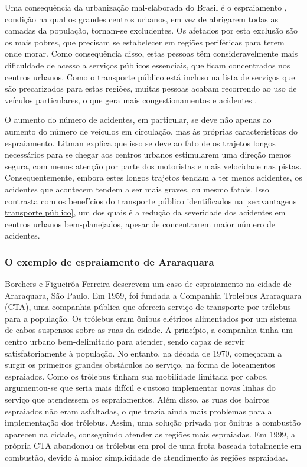 Uma consequência da urbanização mal-elaborada do Brasil é o espraiamento \cite{IPEA:10}, condição na qual os grandes centros urbanos, em vez de abrigarem todas as camadas da população, tornam-se excludentes. Os afetados por esta exclusão são os mais pobres, que precisam se estabelecer em regiões periféricas para terem onde morar. Como consequência disso, estas pessoas têm consideravelmente mais dificuldade de acesso a serviços públicos essenciais, que ficam concentrados nos centros urbanos. Como o transporte público está incluso na lista de serviços que são precarizados para estas regiões, muitas pessoas acabam recorrendo ao uso de veículos particulares, o que gera mais congestionamentos e acidentes \cite{IPEA:16}.

O aumento do número de acidentes, em particular, se deve não apenas ao aumento do número de veículos em circulação, mas às próprias características do espraiamento. Litman \cite{LITMAN:12} explica que isso se deve ao fato de os trajetos longos necessários para se chegar aos centros urbanos estimularem uma direção menos segura, com menos atenção por parte dos motoristas e mais velocidade nas pistas. Consequentemente, embora estes longos trajetos tendam a ter menos acidentes, os acidentes que acontecem tendem a ser mais graves, ou mesmo fatais. Isso contrasta com os benefícios do transporte público identificados na \cref{sec:vantagens transporte público}, um dos quais é a redução da severidade dos acidentes em centros urbanos bem-planejados, apesar de concentrarem maior número de acidentes.

\subsubsection*{O exemplo de espraiamento de Araraquara}
Borchers e Figueirôa-Ferreira \cite{BORCHERS:22} descrevem um caso de espraiamento na cidade de Araraquara, São Paulo. Em 1959, foi fundada a Companhia Troleibus Araraquara (CTA), uma companhia pública que oferecia serviço de transporte por trólebus para a população. Os trólebus eram ônibus elétricos alimentados por um sistema de cabos suspensos sobre as ruas da cidade. A princípio, a companhia tinha um centro urbano bem-delimitado para atender, sendo capaz de servir satisfatoriamente à população. No entanto, na década de 1970, começaram a surgir os primeiros grandes obstáculos ao serviço, na forma de loteamentos espraiados. Como os trólebus tinham sua mobilidade limitada por cabos, argumentou-se que seria mais difícil e custoso implementar novas linhas do serviço que atendessem os espraiamentos. Além disso, as ruas dos bairros espraiados não eram asfaltadas, o que trazia ainda mais problemas para a implementação dos trólebus. Assim, uma solução privada por ônibus a combustão apareceu na cidade, conseguindo atender as regiões mais espraiadas. Em 1999, a própria CTA abandonou os trólebus em prol de uma frota baseada totalmente em combustão, devido à maior simplicidade de atendimento às regiões espraiadas.

